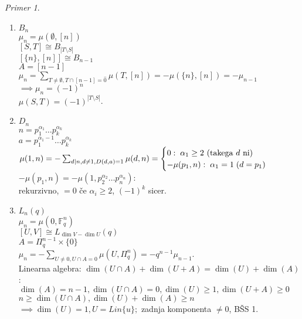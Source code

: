 \documentclass[a4paper, 12pt]{book}
\theoremstyle{definition}
\theoremstyle{remark}
\newtheorem*{ex}{Primer}
\newcommand{\F}{\mathbb{F}}
\begin{document}
\begin{ex} \text{} \\
  \begin{enumerate}[label=(\alph*)]
    \item $B_n$ \\
      $\mu_n = \mu(\emptyset, [n])$ \\
      $[S, T] \cong B_{|T \setminus S|}$ \\
      $\left[\{n\}, [n]\right] \cong B_{n-1}$ \\
      $A = [n-1]$ \\
      $\mu_n = \sum_{T \neq \emptyset, T \cap [n-1] = \hat{0}} \mu(T, [n])
      = -\mu(\{n\}, [n]) = -\mu_{n-1}$ \\
      $\implies \mu_n = (-1)^n$ \\
      $\mu(S, T) = (-1)^{|T \setminus S|}$.
    \item $D_n$ \\
      $n = p_1^{\alpha_1} \dots p_k^{\alpha_k}$ \\
      $a = p_1^{\alpha_1 - 1} \dots p_k^{\alpha_k}$ \\
      $\mu(1, n) = -\sum_{d | n, d \neq 1, D(d,a) = 1} \mu(d, n) \\
      = \begin{cases}
        0: \; \alpha_1 \geq 2 \text{ (takega $d$ ni)} \\
        -\mu(p_1, n): \; \alpha_1 = 1 \; (d = p_1)
      \end{cases}$ \\
      $-\mu(p_1, n) = -\mu(1, p_2^{\alpha_2} \dots p_n^{\alpha_n})$: \\
      rekurzivno, $=0$ če $\alpha_i \geq 2$, $(-1)^k$ sicer.
    \item $L_n(q)$ \\
      $\mu_n = \mu(0, \F_q^n)$ \\
      $[U, V] \cong L_{\dim V - \dim U}(q)$ \\
      $A = \Pi_q^{n-1} \times \{0\}$ \\
      $\mu_n = -\sum_{U \neq 0, U \cap A = 0} \mu(U, \Pi_q^n) = - q^{n-1} \mu_{n-1}$. \\
      Linearna algebra: $\dim (U \cap A) + \dim (U + A) = \dim (U) + \dim(A)$: \\
      $\dim(A) = n-1, \dim(U \cap A) = 0, \dim(U) \geq 1, \dim(U + A) \geq 0$ \\
      $n \geq \dim(U \cap A), \dim(U) + \dim(A) \geq n$ \\
      $\implies \dim(U) = 1, U = Lin \{u\};$ zadnja komponenta $\neq 0$, BŠS 1. \\

\end{enumerate}
\end{ex}
\end{document}
